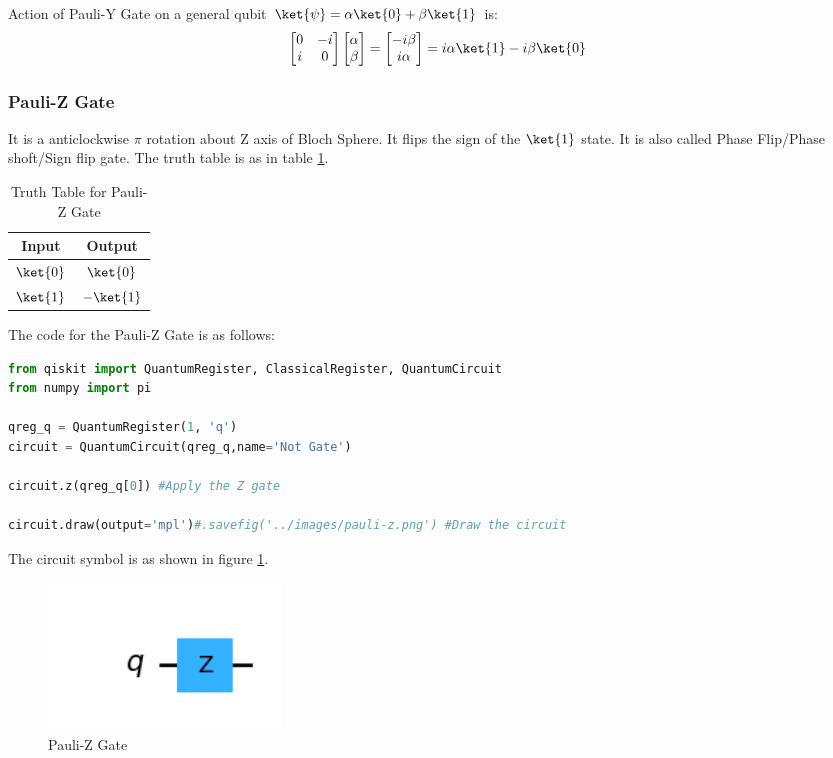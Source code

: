 \documentclass[12pt, oneside]{book}
\theoremstyle{definition}
\theoremstyle{definition}
\theoremstyle{remark}
\begin{document}
Action of Pauli-Y Gate on a general qubit $\ket{\psi}=\alpha\ket{0}+\beta\ket{1}$ is:
\[
    \begin{bmatrix}
        0 & -i \\
        i & 0
    \end{bmatrix}\begin{bmatrix}
        \alpha \\
        \beta
    \end{bmatrix}=\begin{bmatrix}
        -i\beta \\
        i\alpha
    \end{bmatrix}=i\alpha\ket{1}-i\beta\ket{0}
\]

\subsubsection{Pauli-Z Gate}
It is a anticlockwise $\pi$ rotation about Z axis of Bloch Sphere.
It flips the sign of the $\ket{1}$ state. It is also called Phase Flip/Phase shoft/Sign flip gate.
The truth table is as in table \ref{tab:pauli-z}.
\begin{table}[H]
    \centering
    \begin{tabular}{|c|c|}
        \hline
        Input & Output\\
        \hline
        $\ket{0}$ & $\ket{0}$\\
        $\ket{1}$ & $-\ket{1}$\\
        \hline
    \end{tabular}
    \caption{Truth Table for Pauli-Z Gate}
    \label{tab:pauli-z}
\end{table}
The code for the Pauli-Z Gate is as follows:
\begin{lstlisting}[language=Python]
from qiskit import QuantumRegister, ClassicalRegister, QuantumCircuit
from numpy import pi

qreg_q = QuantumRegister(1, 'q')
circuit = QuantumCircuit(qreg_q,name='Not Gate')

circuit.z(qreg_q[0]) #Apply the Z gate

circuit.draw(output='mpl')#.savefig('../images/pauli-z.png') #Draw the circuit
\end{lstlisting}
The circuit symbol is as shown in figure \ref{fig:pauli-z}.
\begin{figure}[H]
    \centering
    \includegraphics[width=0.3\textwidth]{../images/pauli-z.png}
    \caption{Pauli-Z Gate}
    \label{fig:pauli-z}
\end{figure}
\end{document}
